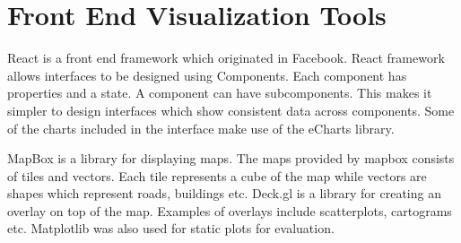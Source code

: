 \section{Front End Visualization Tools}
React\citep{reactjs} is a front end framework which originated in Facebook. React framework allows interfaces to be designed using Components. Each component has properties and a state. A component can have subcomponents. This makes it simpler to design interfaces which show consistent data across components. Some of the charts included in the interface make use of the eCharts library\citep{echarts}.

MapBox\citep{mapbox} is a library for displaying maps. The maps provided by mapbox consists of tiles and vectors. Each tile represents a cube of the map while vectors are shapes which represent roads, buildings etc. Deck.gl\citep{deckgl} is a library for creating an overlay on top of the map. Examples of overlays include scatterplots, cartograms etc. Matplotlib was also used for static plots for evaluation\citep{hunter2007matplotlib}.

